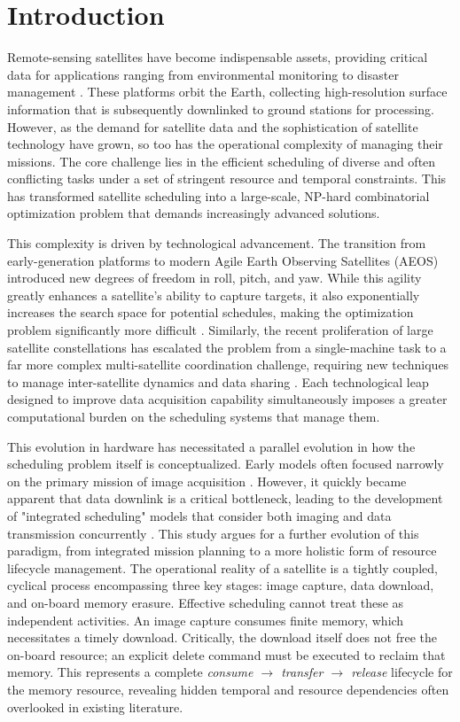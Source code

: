 \documentclass[preprint,3p,12pt,authoryear]{elsarticle}
\begin{document}
\section{Introduction}
Remote-sensing satellites have become indispensable assets, providing critical data for applications ranging from environmental monitoring to disaster management \citep{Madry2013}. These platforms orbit the Earth, collecting high-resolution surface information that is subsequently downlinked to ground stations for processing. However, as the demand for satellite data and the sophistication of satellite technology have grown, so too has the operational complexity of managing their missions. The core challenge lies in the efficient scheduling of diverse and often conflicting tasks under a set of stringent resource and temporal constraints. This has transformed satellite scheduling into a large-scale, NP-hard combinatorial optimization problem that demands increasingly advanced solutions.

This complexity is driven by technological advancement. The transition from early-generation platforms to modern Agile Earth Observing Satellites (AEOS) introduced new degrees of freedom in roll, pitch, and yaw. While this agility greatly enhances a satellite's ability to capture targets, it also exponentially increases the search space for potential schedules, making the optimization problem significantly more difficult \citep{Lemaitre2002}. Similarly, the recent proliferation of large satellite constellations has escalated the problem from a single-machine task to a far more complex multi-satellite coordination challenge, requiring new techniques to manage inter-satellite dynamics and data sharing \citep{augenstein2016optimal, Chen2019}. Each technological leap designed to improve data acquisition capability simultaneously imposes a greater computational burden on the scheduling systems that manage them.

This evolution in hardware has necessitated a parallel evolution in how the scheduling problem itself is conceptualized. Early models often focused narrowly on the primary mission of image acquisition \citep{Lemaitre2002,Gabrel2003}. However, it quickly became apparent that data downlink is a critical bottleneck, leading to the development of "integrated scheduling" models that consider both imaging and data transmission concurrently \citep{Wang2011,Hu2019,Zhang2021}. This study argues for a further evolution of this paradigm, from integrated mission planning to a more holistic form of resource lifecycle management. The operational reality of a satellite is a tightly coupled, cyclical process encompassing three key stages: image capture, data download, and on-board memory erasure. Effective scheduling cannot treat these as independent activities. An image capture consumes finite memory, which necessitates a timely download. Critically, the download itself does not free the on-board resource; an explicit delete command must be executed to reclaim that memory. This represents a complete \textit{consume $\rightarrow$ transfer $\rightarrow$ release} lifecycle for the memory resource, revealing hidden temporal and resource dependencies often overlooked in existing literature.
\end{document}
